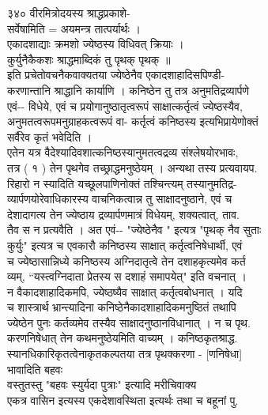 \documentclass[11pt, openany]{book}
\begin{document}
{{{{{{{{{{{{{{{{{{{{{{{{{{{{{{{{{{{{{{{{{{{{{{{{{{{{{{{{{{{{{{{{{{{{{{{{{{{{{{{{{{{{{{{{{{{{{{{{{{{{{{{{{{{{{{{{{{{{{{{{{{{३४० वीरमित्रोदयस्य श्राद्धप्रकाशे-\\
सर्वेषामिति = अयमन्त्र तात्पर्यार्थः ।\\
एकादशाद्याः क्रमशो ज्येष्ठस्य विधिवत् क्रियाः ।\\
कुर्युनैकैकशः श्राद्धमाब्दिकं तु पृथक् पृथक् ॥\\
इति प्रचेतोवचनैकवाक्यतया ज्येष्ठेनैव एकादशाहादिसपिण्डी-\\
करणान्तानि श्राद्धानि कार्याणि । कनिष्ठेन तु तत्र अनुमतिद्रव्यार्पणे\\
एवं-\/- विधेये, एवं च प्रयोगानुष्ठातृत्वरूपं साक्षात्कर्तृत्वं
ज्येष्ठस्यैव,\\
अनुमतत्वरूपमनुग्राहकत्वरूपं वा- कर्तृत्वं कनिष्ठस्य
इत्यभिप्रायेणोक्तं\\
सर्वैरेव कृतं भवेदिति ।\\
एतेन यत्र वैदेश्यादिवशात्कनिष्ठस्यानुमतत्वद्रव्य संश्लेषयोरभावः,\\
तत्र ( १ ) तेन पृथगेव तच्छ्राद्धमनुष्ठेयम् । अन्यथा तस्य प्रत्यवायप.\\
रिहारो न स्यादिति यच्छूलपाणिनोक्तं तश्चिन्त्यम् \textbar{}
तस्यानुमतिद्र-\\
व्यार्पणयोरेवाधिकारस्य वाचनिकत्वान्न तु साक्षादनुष्ठाने, एवं च\\
देशादागत्य तेन ज्येष्ठाय द्रव्यार्पणमात्रं विधेयम्, शक्यत्वात्, ताव.\\
तैव स न प्रत्यवैति । अत एवं-\/- "ज्येष्ठेनैव " इत्यत्र "पृथक् नैव
सुताः\\
कुर्युः" इत्यत्र च एवकारौ कनिष्ठस्य साक्षात् कर्तृत्वनिषेधार्थी, एवं\\
च ज्येष्ठासान्निध्ये कनिष्ठस्य अग्निदातृत्वे तेन दशाहकृत्यमेव कर्त\\
व्यम्, ``यस्त्वग्निदाता प्रेतस्य स दशाहं समापयेत्" इति वचनात् ।\\
न वैकादशाहादिकमपि, ज्येष्ठष्यैव साक्षात् कर्तृत्वबोधनात् । यदि\\
च शास्त्रार्थ भ्रान्त्यादिना कनिष्ठेनैकादशाहादिकमनुष्ठितं तथापि\\
ज्येष्ठेन पुनः कर्तव्यमेव तस्यैव साक्षादनुष्ठानविधानात् । न च पृथ.\\
करणनिषेधात् तेन कथमनुष्ठेयमिति वाच्यम् । कनिष्ठकृतश्राद्ध.\\
स्यानधिकारिकृतत्वेनाकृतकल्पतया तत्र पृथक्करणा - {[}णनिषेधा{]}\\
भावादिति बहवः \textbar{}\\
वस्तुतस्तु "बहवः स्युर्यदा पुत्राः" इत्यादि मरीचिवाक्य\\
एकत्र वासिन इत्यस्य एकदेशावस्थिता इत्यर्थः तथा च बहूनां पु.\\
}}}}}}}}}}}}}}}}}}}}}}}}}}}}}}}}}}}}}}}}}}}}}}}}}}}}}}}}}}}}}}}}}}}}}}}}}}}}}}}}}}}}}}}}}}}}}}}}}}}}}}}}}}}}}}}}}}}}}}}}}}}
\end{document}
